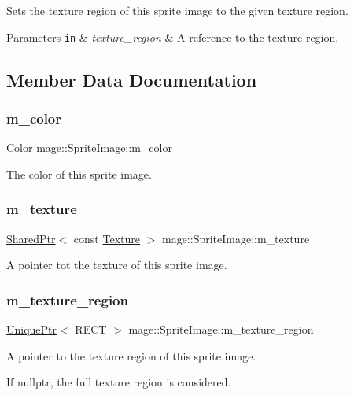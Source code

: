 Sets the texture region of this sprite image to the given texture region.


\begin{DoxyParams}[1]{Parameters}
\mbox{\tt in}  & {\em texture\+\_\+region} & A reference to the texture region. \\
\hline
\end{DoxyParams}


\subsection{Member Data Documentation}
\hypertarget{classmage_1_1_sprite_image_a63331a3170f5af1a14b15913afc59ce2}{}\label{classmage_1_1_sprite_image_a63331a3170f5af1a14b15913afc59ce2} 
\subsubsection{\texorpdfstring{m\+\_\+color}{m\_color}}
{\footnotesize\ttfamily \hyperlink{structmage_1_1_color}{Color} mage\+::\+Sprite\+Image\+::m\+\_\+color\hspace{0.3cm}{\ttfamily [private]}}

The color of this sprite image. \hypertarget{classmage_1_1_sprite_image_ac0b448632850419c9df66caf887ca09f}{}\label{classmage_1_1_sprite_image_ac0b448632850419c9df66caf887ca09f} 
\subsubsection{\texorpdfstring{m\+\_\+texture}{m\_texture}}
{\footnotesize\ttfamily \hyperlink{namespacemage_a1e01ae66713838a7a67d30e44c67703e}{Shared\+Ptr}$<$ const \hyperlink{classmage_1_1_texture}{Texture} $>$ mage\+::\+Sprite\+Image\+::m\+\_\+texture\hspace{0.3cm}{\ttfamily [private]}}

A pointer tot the texture of this sprite image. \hypertarget{classmage_1_1_sprite_image_a8d20ef6d6470dc01f73a599060953b65}{}\label{classmage_1_1_sprite_image_a8d20ef6d6470dc01f73a599060953b65} 
\subsubsection{\texorpdfstring{m\+\_\+texture\+\_\+region}{m\_texture\_region}}
{\footnotesize\ttfamily \hyperlink{namespacemage_a3316d7143a973e37adf1110f2e80ca31}{Unique\+Ptr}$<$ R\+E\+CT $>$ mage\+::\+Sprite\+Image\+::m\+\_\+texture\+\_\+region\hspace{0.3cm}{\ttfamily [private]}}

A pointer to the texture region of this sprite image.

If {\ttfamily nullptr}, the full texture region is considered. 